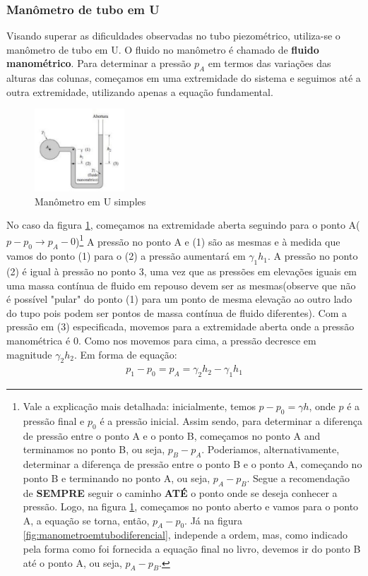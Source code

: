 \documentclass{article}
\begin{document}
\subsubsection{Manômetro de tubo em U}
Visando superar as dificuldades observadas no tubo piezométrico, utiliza-se o manômetro de tubo em U. O fluido no manômetro é chamado de \textbf{fluido manométrico}. Para determinar a pressão $p_A$ em termos das variações das alturas das colunas, começamos em uma extremidade do sistema e seguimos até a outra extremidade, utilizando apenas a equação fundamental.

\begin{figure}[h]
     \centering
     \includegraphics[width=0.3\textwidth]{manometroemtubosimples.jpg} 
     \caption{Manômetro em U simples} 
     \label{fig:manometroemtubosimples} 
     \hfill
\end{figure}



No caso da figura \ref{fig:manometroemtubosimples}, começamos na extremidade aberta seguindo para o ponto A($p-p_0 \rightarrow p_A-0$)\footnote{Vale a explicação mais detalhada: inicialmente, temos $p-p_0 = \gamma h$, onde $p$ é a pressão final e $p_0$ é a pressão inicial. Assim sendo, para determinar a diferença de pressão entre o ponto A e o ponto B, começamos no ponto A and terminamos no ponto B, ou seja, $p_B - p_A$. Poderiamos, alternativamente, determinar a diferença de pressão entre o ponto B e o ponto A, começando no ponto B e terminando no ponto A, ou seja, $p_A - p_B$. Segue a recomendação de \textbf{SEMPRE} seguir o caminho \textbf{ATÉ} o ponto onde se deseja conhecer a pressão. Logo, na figura \ref{fig:manometroemtubosimples}, começamos no ponto aberto e vamos para o ponto A, a equação se torna, então, $p_A-p_0$. Já na figura \ref{fig:manometroemtubodiferencial}, independe a ordem, mas, como indicado pela forma como foi fornecida a equação final no livro, devemos ir do ponto B até o ponto A, ou seja, $p_A - p_B$.} A pressão no ponto A e (1) são as mesmas e à medida que vamos do ponto (1) para o (2) a pressão aumentará em $\gamma_1 h_1$. A pressão no ponto (2) é igual à pressão no ponto 3, uma vez que as pressões em elevações iguais em uma massa contínua de fluido em repouso devem ser as mesmas(observe que não é possível "pular" do ponto (1) para um ponto de mesma elevação ao outro lado do tupo pois podem ser pontos de massa contínua de fluido diferentes). Com a pressão em (3) especificada, movemos para a extremidade aberta onde a pressão manométrica é 0. Como nos movemos para cima, a pressão decresce em magnitude $\gamma_2 h_2$. Em forma de equação:
\begin{align*}
\boxed{p_1-p_0 = p_A = \gamma_2 h_2 - \gamma_1 h_1}
\end{align*}
\end{document}

